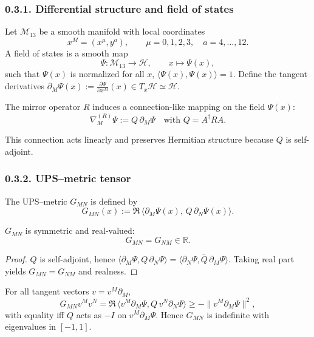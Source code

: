 \subsubsection*{0.3.1. Differential structure and field of states}

Let $\mathcal{M}_{13}$ be a smooth manifold with local coordinates
\[
x^M=(x^\mu,y^a),\qquad \mu=0,1,2,3,\quad a=4,\dots,12.
\]
A field of states is a smooth map
\[
\Psi:\mathcal{M}_{13}\longrightarrow\mathcal{H}, \qquad 
x\mapsto \Psi(x),
\]
such that $\Psi(x)$ is normalized for all $x$,
$\langle\Psi(x),\Psi(x)\rangle=1$.
Define the tangent derivatives
$\partial_M\Psi(x):=\frac{\partial\Psi}{\partial x^M}(x)\in T_x\mathcal{H}\simeq\mathcal{H}$.

\begin{definition}
The mirror operator $R$ induces a connection-like mapping on the field $\Psi(x)$:
\[
\nabla^{(R)}_M \Psi := Q\,\partial_M\Psi
\quad\text{with } Q=A^\dagger R A.
\]
\end{definition}

This connection acts linearly and preserves Hermitian structure because $Q$ is self-adjoint.

\subsubsection*{0.3.2. UPS–metric tensor}

\begin{definition}
The UPS–metric $G_{MN}$ is defined by
\[
G_{MN}(x)
:=\Re\,\big\langle \partial_M\Psi(x),\, Q\,\partial_N\Psi(x)\big\rangle.
\]
\end{definition}

\begin{theorem}
$G_{MN}$ is symmetric and real-valued:
\[
G_{MN}=G_{NM}\in\mathbb{R}.
\]
\end{theorem}

\begin{proof}
$Q$ is self-adjoint, hence
$\langle\partial_M\Psi,Q\,\partial_N\Psi\rangle
=\overline{\langle\partial_N\Psi,Q\,\partial_M\Psi\rangle}$.
Taking real part yields $G_{MN}=G_{NM}$ and realness.
\end{proof}

\begin{lemma}
For all tangent vectors $v=v^M\partial_M$,
\[
G_{MN}v^Mv^N=\Re\,\langle v^M\partial_M\Psi,Q\,v^N\partial_N\Psi\rangle
\ge -\|v^M\partial_M\Psi\|^2,
\]
with equality iff $Q$ acts as $-I$ on $v^M\partial_M\Psi$.
Hence $G_{MN}$ is indefinite with eigenvalues in $[-1,1]$.
\end{lemma}

